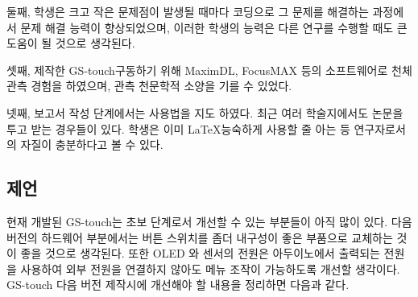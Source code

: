 둘째, 학생은 크고 작은 문제점이 발생될 때마다 코딩으로 그 문제를 해결하는 과정에서 문제 해결 능력이 향상되었으며, 이러한 학생의 능력은 다른 연구를 수행할 때도 큰 도움이 될 것으로 생각된다.  

셋째, 제작한 GS-touch\를 구동하기 위해 MaximDL, FocusMAX 등의 소프트웨어로 천체 관측 경험을 하였으며, 관측 천문학적 소양을 기를 수 있었다. 

넷째, 보고서 작성 단계에서는 \LaTex 사용법을 지도 하였다. 최근 여러 학술지에서도 논문을 \LaTex\로 투고 받는 경우들이 있다. 학생은 이미 \LaTeX\을 능숙하게 사용할 줄 아는 등 연구자로서의 자질이 충분하다고 볼 수 있다. 

\subsection{제언}

현재 개발된 GS-touch는 초보 단계로서 개선할 수 있는 부분들이 아직 많이 있다. 다음 버전의 하드웨어 부분에서는 버튼 스위치를 좀더 내구성이 좋은 부품으로 교체하는 것이 좋을 것으로 생각된다. 또한 OLED 와 센서의 전원은 아두이노에서 출력되는 전원을 사용하여 외부 전원을 연결하지 않아도 메뉴 조작이 가능하도록 개선할 생각이다. GS-touch 다음 버전 제작시에 개선해야 할 내용을 정리하면 다음과 같다. 

